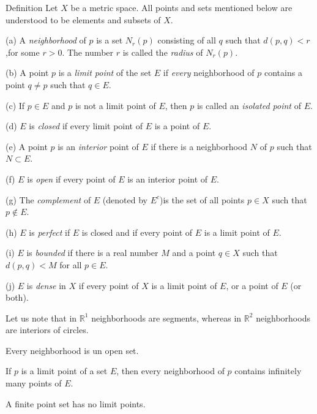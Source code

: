 \begin{myDefinition}\label{myDefinition:2.18 important}
    Definition Let $X$ be a metric space. All points and sets mentioned below are understood to be elements and subsets of $X$.

    (a) A \emph{neighborhood} of $p$ is a set $N_r(p)$ consisting of all $q$ such that $d(p, q) < r$,for some $r > 0$. The number $r$ is called the \emph{radius} of $N_r(p)$.

    (b) A point $p$ is a \emph{limit point} of the set $E$ if \emph{every} neighborhood of $p$ contains a point $q \neq p$ such that $q \in E$.
    
    (c) If $p \in E$ and $p$ is not a limit point of $E$, then $p$ is called an \emph{isolated point} of $E$.
    
    (d) $E$ is \emph{closed} if every limit point of $E$ is a point of $E$.
    
    (e) A point $p$ is an \emph{interior} point of $E$ if there is a neighborhood $N$ of $p$ such that $N \subset E$.
    
    (f) $E$ is \emph{open} if every point of $E$ is an interior point of $E$.
    
    (g) The \emph{complement} of $E$ (denoted by $E^c$)is the set of all points $p \in X$
    such that $p \not\in E$.
    
    (h) $E$ is \emph{perfect} if $E$ is closed and if every point of $E$ is a limit point
    of $E$.
    
    (i) $E$ is \emph{bounded} if there is a real number $M$ and a point $q \in X$ such that $d(p,q)< M$ for all $p \in E$.
    
    (j) $E$ is \emph{dense} in $X$ if every point of $X$ is a limit point of $E$, or a point of $E$ (or both).
\end{myDefinition}

Let us note that in $\mathbb{R}^1$ neighborhoods are segments, whereas in $\mathbb{R}^2$ neighborhoods are interiors of circles.

\begin{thm}\label{thm:2.19 neighbhood is open}
    Every neighborhood is un open set.
\end{thm}

\begin{thm}\label{thm:2.20}
    If $p$ is a limit point of a set $E$, then every neighborhood of $p$ contains infinitely many points of $E$.
\end{thm}

\begin{myCorollary}
    A finite point set has no limit points.
\end{myCorollary}

